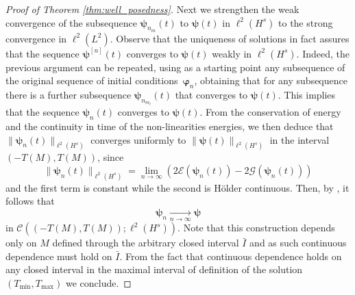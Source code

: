 \documentclass[12pt,a4paper]{amsart}
\numberwithin{equation}{section}
\newcommand{\ulpsi}{\boldsymbol{\psi}}
\newcommand{\ulphi}{\boldsymbol{\varphi}}
\begin{document}
\begin{proof}[Proof of Theorem \ref{thm:well_posedness}]
		Next we strengthen the weak convergence of the subsequence $\ulpsi_{n_m}(t)$ to $\ulpsi(t)$ in $\ell^2(H^s)$ to the strong convergence in $\ell^2(L^2)$. Observe that the uniqueness of solutions in fact assures that the sequence $\ulpsi^{[n]}(t)$ converges to $\ulpsi(t)$ weakly in $\ell^2(H^s)$. Indeed, the previous argument can be repeated, using as a starting point any subsequence of the original sequence of initial conditions~$\ulphi_{n}$, obtaining that for any subsequence there is a further subsequence $\ulpsi_{n_{m_l}}(t)$ that converges to $\ulpsi(t)$. This implies that the sequence $ \ulpsi_{n}(t) $ converges to $\ulpsi(t)$. From the conservation of energy and the continuity in time of the non-linearities energies, we then deduce that~$\| \ulpsi_{n}(t) \|_{\ell^2(H^s)}$ converges uniformly to $\| \ulpsi(t) \|_{\ell^2(H^s)}$ in the interval $(-T(M),T(M))$, since
		\begin{equation}
			\| \ulpsi_{n} (t) \|_{\ell^2(H^s)} =  \lim_{n \rightarrow \infty} (2\mathcal{E}(\ulpsi_{n}(t)) -2 \mathscr{G}(\ulpsi_{n}(t) )) 
		\end{equation}
		and the first term is constant while the second is H\"older continuous. %
		Then, by \cite[Proposition 1.1.2 ii)]{cazenave2003semilinear}, it follows that
		\begin{equation}
			\ulpsi_{n} \xrightarrow[n\to \infty]{} \ulpsi 
		\end{equation}
		in $\mathscr{C}((-T(M),T(M));\ell^2(H^s))$.
		Note that this construction depends only on $M$ defined through the arbitrary closed interval $\bar{I}$ and as such continuous dependence must hold on $\bar{I}$. From the fact that continuous dependence holds on any closed interval in the maximal interval of definition of the solution $ (T_{\mathrm{min}},T_{\mathrm{max}})$ we conclude.
	\end{proof}
	
\end{document}

